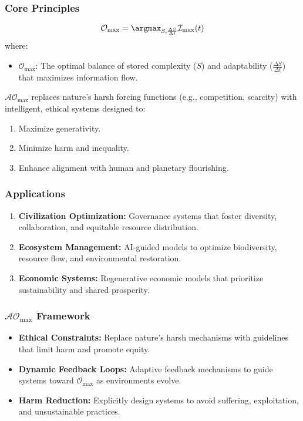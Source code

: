 \documentclass[12pt]{article}
\begin{document}
\subsubsection{Core Principles}
\[
\mathcal{O}_{\text{max}} = \argmax_{S, \frac{\Delta S}{\Delta t}} \mathcal{I}_{\text{max}}(t)
\]
where:
\begin{itemize}
    \item \( \mathcal{O}_{\text{max}} \): The optimal balance of stored complexity (\( S \)) and adaptability (\( \frac{\Delta S}{\Delta t} \)) that maximizes information flow.
\end{itemize}

\( \mathcal{AO}_{\text{max}} \) replaces nature’s harsh forcing functions (e.g., competition, scarcity) with intelligent, ethical systems designed to:
\begin{enumerate}
    \item Maximize generativity.
    \item Minimize harm and inequality.
    \item Enhance alignment with human and planetary flourishing.
\end{enumerate}

\subsubsection{Applications}
\begin{enumerate}
    \item \textbf{Civilization Optimization:} Governance systems that foster diversity, collaboration, and equitable resource distribution.
    \item \textbf{Ecosystem Management:} AI-guided models to optimize biodiversity, resource flow, and environmental restoration.
    \item \textbf{Economic Systems:} Regenerative economic models that prioritize sustainability and shared prosperity.
\end{enumerate}

\subsubsection{\( \mathcal{AO}_{\text{max}} \) Framework}
\begin{itemize}
    \item \textbf{Ethical Constraints:} Replace nature’s harsh mechanisms with guidelines that limit harm and promote equity.
    \item \textbf{Dynamic Feedback Loops:} Adaptive feedback mechanisms to guide systems toward \( \mathcal{O}_{\text{max}} \) as environments evolve.
    \item \textbf{Harm Reduction:} Explicitly design systems to avoid suffering, exploitation, and unsustainable practices.
\end{itemize}
\end{document}
